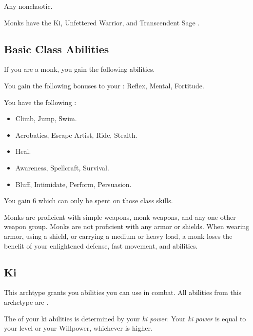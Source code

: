      Any nonchaotic.

     Monks have the Ki, Unfettered Warrior, and Transcendent Sage .

    \subsection{Basic Class Abilities}
        If you are a monk, you gain the following abilities.

        You gain the following bonuses to your :  Reflex,  Mental,  Fortitude.

        You have the following :
        \begin{itemize}
            \item {} Climb, Jump, Swim.
            \item {} Acrobatics, Escape Artist, Ride, Stealth.
            \item {} Heal.
            \item {} Awareness, Spellcraft, Survival.
            \item {} Bluff, Intimidate, Perform, Persuasion.
        \end{itemize}
        You gain 6  which can only be spent on those class skills.

        Monks are proficient with simple weapons, monk weapons, and any one other weapon group.
        Monks are not proficient with any armor or shields.
        When wearing armor, using a shield, or carrying a medium or heavy load, a monk loses the benefit of your enlightened defense, fast movement, and \ki abilities.

    \subsection{Ki}
        This archtype grants you abilities you can use in combat.
        All abilities from this archetype are .

        The  of your ki abilities is determined by your \textit{ki power}.
        Your \textit{ki power} is equal to your level or your Willpower, whichever is higher.

